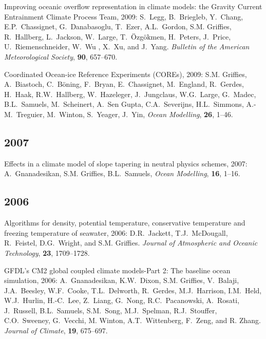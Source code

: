 \begin{etaremune}
\item Improving oceanic overflow representation in climate models: the   Gravity Current Entrainment Climate Process Team, 2009: S.\ Legg, B.\ Briegleb, Y.\ Chang, E.P.\ Chassignet, G.\ Danabasoglu, T.\ Ezer, A.L.\ Gordon, S.M. Grif\/f\/ies, R.\ Hallberg, L.\ Jackson, W.\ Large, T.\ \"Ozg\"okmen, H.\ Peters, J.\ Price, U.\
  Riemenschneider, W.\ Wu , X.\ Xu, and J.\ Yang.  {\em Bulletin of the American Meteorological Society}, {\bf 90}, 657--670.

\item Coordinated Ocean-ice Reference Experiments (COREs), 2009: S.M. Grif\/f\/ies, A.\ Biastoch, C.\ B\"{o}ning, F.\ Bryan, E.\
  Chassignet, M.\ England, R.\ Gerdes, H.\ Haak, R.W.\ Hallberg, W.\  Hazeleger, J.\ Jungclaus, W.G.\ Large, G.\ Madec, B.L.\ Samuels, M.\  Scheinert, A.\ Sen Gupta, C.A.\ Severijns, H.L.\ Simmons, A.-M.\  Treguier, M.\ Winton, S.\ Yeager, J.\ Yin,  {\em Ocean Modelling},  {\bf 26}, 1--46.  

\subsection*{\sc \color{Maroon} 2007}

\item Effects in a climate model of slope tapering in neutral physics schemes, 2007: A.\ Gnanadesikan, S.M. Grif\/f\/ies, B.L.\ Samuels, {\em Ocean Modelling}, {\bf 16}, 1--16.
  
\subsection*{\sc \color{Maroon} 2006}

\item Algorithms for density, potential temperature, conservative temperature and freezing temperature of seawater, 2006: D.R.\  Jackett, T.J.\ McDougall, R.\ Feistel, D.G.\ Wright, and S.M. Grif\/f\/ies.  {\em Journal of Atmospheric and Oceanic Technology}, {\bf 23}, 1709--1728.

\item GFDL's CM2 global coupled climate models-Part 2: The baseline ocean simulation, 2006: A.\ Gnanadesikan, K.W.\ Dixon, S.M. Grif\/f\/ies, V.\ Balaji, J.A.\ Beesley, W.F.\ Cooke, T.L.\ Delworth,  R.\ Gerdes, M.J.\ Harrison, I.M.\ Held, W.J.\ Hurlin, H.-C.\ Lee,
  Z.\ Liang, G.\ Nong, R.C.\ Pacanowski, A.\ Rosati, J.\ Russell,  B.L.\ Samuels, S.M.\ Song, M.J.\ Spelman, R.J.\ Stouffer, C.O.\  Sweeney, G.\ Vecchi, M. Winton, A.T.\ Wittenberg, F.\ Zeng, and  R. Zhang.  {\em Journal of Climate}, {\bf 19}, 675--697.


\end{etaremune}
